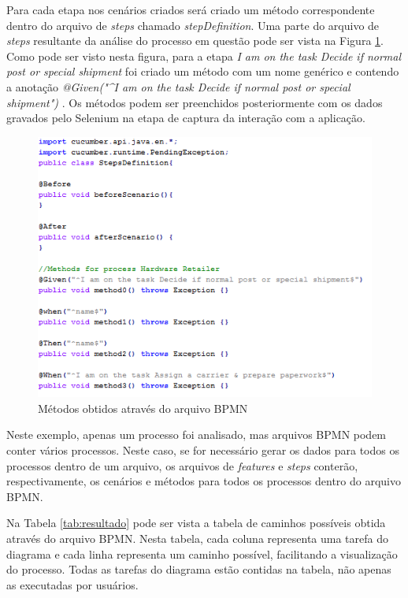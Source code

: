 \documentclass[12pt]{article}
\begin{document}

Para cada etapa nos cenários criados será criado um método correspondente dentro do arquivo de \emph{steps} chamado \emph{stepDefinition}. Uma parte do arquivo de \emph{steps} resultante da análise do processo em questão pode ser vista na Figura \ref{fig:steps_resultado}. Como pode ser visto nesta figura, para a etapa \emph{I am on the task Decide if normal post or special shipment} foi criado um método com um nome genérico e contendo a anotação \emph{@Given("\^{}I am on the task Decide if normal post or special shipment\textdollar{}") 
}. Os métodos podem ser preenchidos posteriormente com os dados gravados pelo Selenium na etapa de captura da interação com a aplicação.

\begin{figure}[ht]
\includegraphics[width=.8\paperwidth]{figuras/steps.png}
\caption{Métodos obtidos através do arquivo BPMN}
\label{fig:steps_resultado}
\end{figure}

Neste exemplo, apenas um processo foi analisado, mas arquivos BPMN podem conter vários processos. Neste caso, se for necessário gerar os dados para todos os processos dentro de um arquivo, os arquivos de \emph{features} e \emph{steps} conterão, respectivamente, os cenários e métodos para todos os processos dentro do arquivo BPMN. 

Na Tabela \ref{tab:resultado} pode ser vista a tabela de caminhos possíveis obtida através do arquivo BPMN. Nesta tabela, cada coluna representa uma tarefa do diagrama e cada linha representa um caminho possível, facilitando a visualização do processo. Todas as tarefas do diagrama estão contidas na tabela, não apenas as executadas por usuários.
\end{document}
